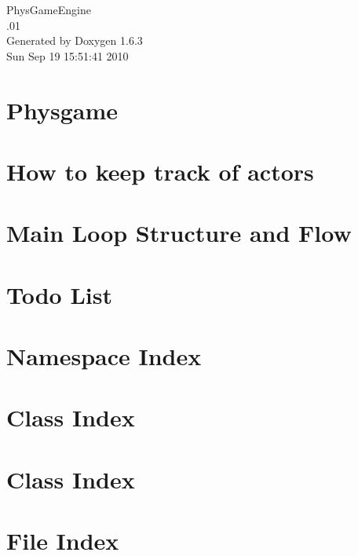 \documentclass[a4paper]{book}
\begin{document}
\hypersetup{pageanchor=false}
\begin{titlepage}
\vspace*{7cm}
\begin{center}
{\Large PhysGameEngine \\[1ex]\large .01 }\\
\vspace*{1cm}
{\large Generated by Doxygen 1.6.3}\\
\vspace*{0.5cm}
{\small Sun Sep 19 15:51:41 2010}\\
\end{center}
\end{titlepage}
\clearemptydoublepage
{}
\tableofcontents
\clearemptydoublepage
{}
\hypersetup{pageanchor=true}
\chapter{Physgame}
\label{index}\hypertarget{index}{}
\chapter{How to keep track of actors}
\label{actorcontainer1}
\hypertarget{actorcontainer1}{}

\chapter{Main Loop Structure and Flow}
\label{mainloop1}
\hypertarget{mainloop1}{}

\chapter{Todo List}
\label{todo}
\hypertarget{todo}{}

\chapter{Namespace Index}

\chapter{Class Index}

\chapter{Class Index}

\chapter{File Index}

\end{document}
